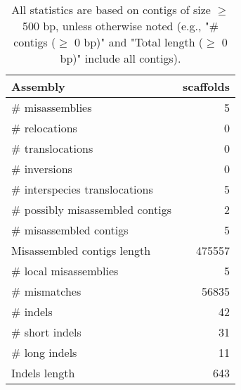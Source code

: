 \documentclass[12pt,a4paper]{article}
\begin{document}
\begin{table}[ht]
\begin{center}
\caption{All statistics are based on contigs of size $\geq$ 500 bp, unless otherwise noted (e.g., "\# contigs ($\geq$ 0 bp)" and "Total length ($\geq$ 0 bp)" include all contigs).}
\begin{tabular}{|l*{1}{|r}|}
\hline
Assembly & scaffolds \\ \hline
\# misassemblies & 5 \\ \hline
\hspace{5mm}\# relocations & 0 \\ \hline
\hspace{5mm}\# translocations & 0 \\ \hline
\hspace{5mm}\# inversions & 0 \\ \hline
\hspace{5mm}\# interspecies translocations & 5 \\ \hline
\# possibly misassembled contigs & 2 \\ \hline
\# misassembled contigs & 5 \\ \hline
Misassembled contigs length & 475557 \\ \hline
\# local misassemblies & 5 \\ \hline
\# mismatches & 56835 \\ \hline
\# indels & 42 \\ \hline
\hspace{5mm}\# short indels & 31 \\ \hline
\hspace{5mm}\# long indels & 11 \\ \hline
Indels length & 643 \\ \hline
\end{tabular}
\end{center}
\end{table}
\end{document}
